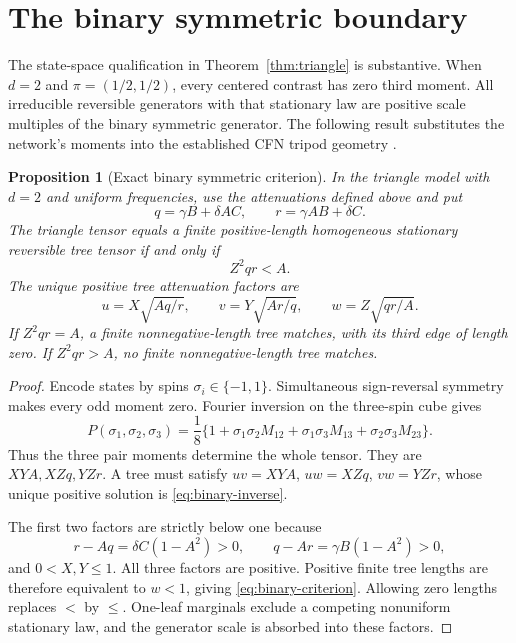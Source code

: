 \documentclass[11pt]{article}
\newtheorem{proposition}[theorem]{Proposition}
\theoremstyle{definition}
\theoremstyle{remark}
\begin{document}
\section{The binary symmetric boundary}\label{sec:binary}

The state-space qualification in Theorem~\ref{thm:triangle} is substantive.
When $d=2$ and $\pi=(1/2,1/2)$, every centered contrast has zero third
moment. All irreducible reversible generators with that stationary law
are positive scale multiples of the binary symmetric generator.
The following result substitutes the network's moments into the
established CFN tripod geometry \cite{Hill2024}.

\begin{proposition}[Exact binary symmetric criterion]\label{prop:binary}
In the triangle model with $d=2$ and uniform frequencies, use the
attenuations defined above and put
\[
 q=\gamma B+\delta AC,\qquad r=\gamma AB+\delta C.
\]
The triangle tensor equals a finite positive-length homogeneous stationary
reversible tree tensor if and only if
\begin{equation}\label{eq:binary-criterion}
 Z^2qr<A.
\end{equation}
The unique positive tree attenuation factors are
\begin{equation}\label{eq:binary-inverse}
 u=X\sqrt{Aq/r},\qquad v=Y\sqrt{Ar/q},\qquad
 w=Z\sqrt{qr/A}.
\end{equation}
If $Z^2qr=A$, a finite nonnegative-length tree matches, with its third
edge of length zero. If $Z^2qr>A$, no finite nonnegative-length tree
matches.
\end{proposition}
\begin{proof}
Encode states by spins $\sigma_i\in\{-1,1\}$. Simultaneous sign-reversal
symmetry makes every odd moment zero. Fourier inversion on the three-spin
cube gives
\begin{equation}\label{eq:binary-fourier}
 P(\sigma_1,\sigma_2,\sigma_3)=\frac18
 \{1+\sigma_1\sigma_2M_{12}+\sigma_1\sigma_3M_{13}
                         +\sigma_2\sigma_3M_{23}\}.
\end{equation}
Thus the three pair moments determine the whole tensor. They are
$XYA,XZq,YZr$. A tree must satisfy
$uv=XYA$, $uw=XZq$, $vw=YZr$, whose unique positive solution is
\eqref{eq:binary-inverse}.

The first two factors are strictly below one because
\[
 r-Aq=\delta C(1-A^2)>0,\qquad
 q-Ar=\gamma B(1-A^2)>0,
\]
and $0<X,Y\le1$. All three factors are positive. Positive finite tree
lengths are therefore equivalent to $w<1$, giving
\eqref{eq:binary-criterion}. Allowing zero lengths replaces $<$ by
$\le$. One-leaf marginals exclude a competing nonuniform stationary
law, and the generator scale is absorbed into these factors.
\end{proof}
\end{document}

